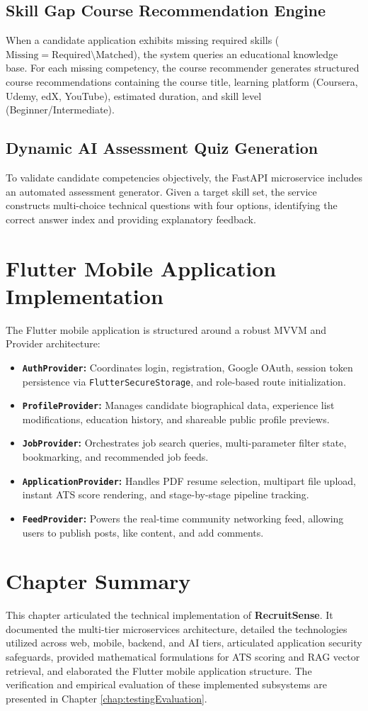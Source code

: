 \subsection{Skill Gap Course Recommendation Engine}
When a candidate application exhibits missing required skills ($\text{Missing} = \text{Required} \setminus \text{Matched}$), the system queries an educational knowledge base. For each missing competency, the course recommender generates structured course recommendations containing the course title, learning platform (Coursera, Udemy, edX, YouTube), estimated duration, and skill level (Beginner/Intermediate).

\subsection{Dynamic AI Assessment Quiz Generation}
To validate candidate competencies objectively, the FastAPI microservice includes an automated assessment generator. Given a target skill set, the service constructs multi-choice technical questions with four options, identifying the correct answer index and providing explanatory feedback.

\section{Flutter Mobile Application Implementation}
The Flutter mobile application is structured around a robust MVVM and Provider architecture:
\begin{itemize}
    \item \textbf{\texttt{AuthProvider}:} Coordinates login, registration, Google OAuth, session token persistence via \texttt{FlutterSecureStorage}, and role-based route initialization.
    \item \textbf{\texttt{ProfileProvider}:} Manages candidate biographical data, experience list modifications, education history, and shareable public profile previews.
    \item \textbf{\texttt{JobProvider}:} Orchestrates job search queries, multi-parameter filter state, bookmarking, and recommended job feeds.
    \item \textbf{\texttt{ApplicationProvider}:} Handles PDF resume selection, multipart file upload, instant ATS score rendering, and stage-by-stage pipeline tracking.
    \item \textbf{\texttt{FeedProvider}:} Powers the real-time community networking feed, allowing users to publish posts, like content, and add comments.
\end{itemize}

\section{Chapter Summary}
This chapter articulated the technical implementation of \textbf{RecruitSense}. It documented the multi-tier microservices architecture, detailed the technologies utilized across web, mobile, backend, and AI tiers, articulated application security safeguards, provided mathematical formulations for ATS scoring and RAG vector retrieval, and elaborated the Flutter mobile application structure. The verification and empirical evaluation of these implemented subsystems are presented in Chapter \ref{chap:testingEvaluation}.
